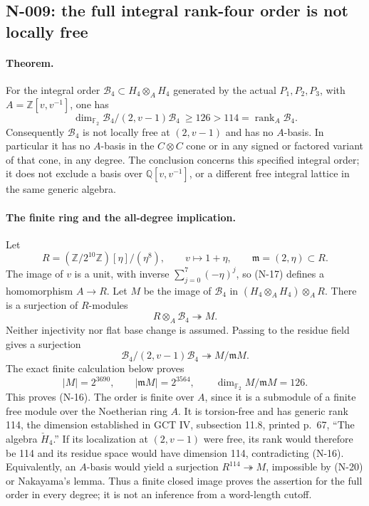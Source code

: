 \subsection{N-009: the full integral rank-four order is not locally free}
\label{sec:nonstandard-nonfree}

\paragraph{Theorem.}
For the integral order $\mathcal B_4\subset H_4\otimes_A H_4$ generated
by the actual $P_1,P_2,P_3$, with $A=\mathbb Z[v,v^{-1}]$, one has
\[
 \dim_{\mathbb F_2}\mathcal B_4/(2,v-1)\mathcal B_4\ \ge126>114
       =\operatorname{rank}_A\mathcal B_4.
 \tag{N-16}
\]
Consequently $\mathcal B_4$ is not locally free at $(2,v-1)$ and has
no $A$-basis.  In particular it has no $A$-basis in the $C\otimes C$
cone or in any signed or factored variant of that cone, in any degree.
The conclusion concerns this specified integral order; it does not
exclude a basis over $\mathbb Q[v,v^{-1}]$, or a different free
integral lattice in the same generic algebra.

\paragraph{The finite ring and the all-degree implication.}
Let
\[
 R=(\mathbb Z/2^{10}\mathbb Z)[\eta]/(\eta^8),\qquad
 v\longmapsto1+\eta,
 \qquad\mathfrak m=(2,\eta)\subset R.
 \tag{N-17}
\]
The image of $v$ is a unit, with inverse
$\sum_{j=0}^7(-\eta)^j$, so (N-17) defines a homomorphism $A\to R$.
Let $M$ be the image of $\mathcal B_4$ in
$(H_4\otimes_A H_4)\otimes_A R$.  There is a surjection of
$R$-modules
\[
                  R\otimes_A\mathcal B_4\twoheadrightarrow M.
 \tag{N-18}
\]
Neither injectivity nor flat base change is assumed.  Passing to the
residue field gives a surjection
\[
 \mathcal B_4/(2,v-1)\mathcal B_4\twoheadrightarrow M/\mathfrak mM.
 \tag{N-19}
\]
The exact finite calculation below proves
\[
 |M|=2^{3690},\qquad|\mathfrak mM|=2^{3564},\qquad
 \dim_{\mathbb F_2}M/\mathfrak mM=126.
 \tag{N-20}
\]
This proves (N-16).  The order is finite over $A$, since it is a
submodule of a finite free module over the Noetherian ring $A$.
It is torsion-free and has generic rank 114, the dimension established
in GCT IV, subsection 11.8, printed p.~67, ``The algebra $\check H_4$.''
If its localization at $(2,v-1)$ were free, its rank would therefore
be 114 and its residue space would have dimension 114, contradicting
(N-16).  Equivalently, an $A$-basis would yield a surjection
$R^{114}\twoheadrightarrow M$, impossible by (N-20) or Nakayama's
lemma.  Thus a finite closed image proves the assertion for the full
order in every degree; it is not an inference from a word-length cutoff.


